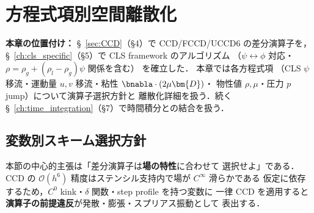 %
%
\section{方程式項別空間離散化}
\label{ch:per_term_spatial}

\noindent\textbf{本章の位置付け：}
§~\ref{sec:CCD}（§4）で CCD/FCCD/UCCD6 の差分演算子を，
§~\ref{ch:cls_specific}（§5）で CLS framework のアルゴリズム
（$\psi\leftrightarrow\phi$ 対応・$\rho=\rho_g+(\rho_l-\rho_g)\psi$ 関係を含む）
を確立した．
本章では各方程式項
（CLS $\psi$ 移流・運動量 $u,v$ 移流・粘性 $\bnabla\cdot(2\mu\bm{D})$・
物性値 $\rho,\mu$・圧力 $p$ jump）について演算子選択方針と
離散化詳細を扱う．続く §~\ref{ch:time_integration}（§7）で時間積分との結合を扱う．

\subsection{変数別スキーム選択方針}
\label{sec:scheme_per_variable}

本節の中心的主張は「差分演算子は\textbf{場の特性}に合わせて
選択せよ」である．
CCD の $\mathcal{O}(h^6)$ 精度はステンシル支持内で場が $C^\infty$ 滑らかである
仮定に依存するため，$C^0$ kink・$\delta$ 関数・step profile を持つ変数に
一律 CCD を適用すると\textbf{演算子の前提違反}が発散・膨張・スプリアス振動として
表出する．

